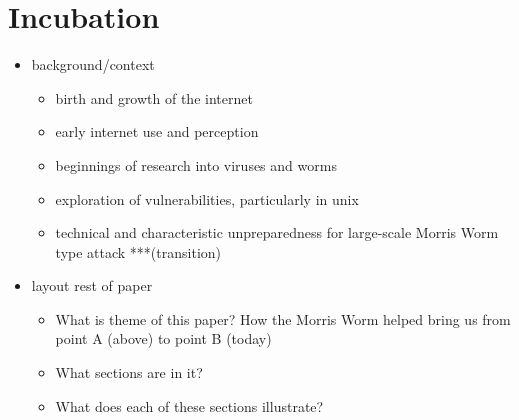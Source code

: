 \section*{Incubation}
\setcounter{page}{1}

\begin{itemize}
\item background/context
	\begin{itemize}
	\item birth and growth of the internet
    \item early internet use and perception
    \item beginnings of research into viruses and worms
    \item exploration of vulnerabilities, particularly in unix
    \item technical and characteristic unpreparedness for large-scale Morris Worm type attack ***(transition)
	\end{itemize}
\item layout rest of paper
	\begin{itemize}
	\item What is theme of this paper? How the Morris Worm helped bring us from point A (above) to point B (today)
	\item What sections are in it?
	\item What does each of these sections illustrate?
	\end{itemize}
\end{itemize}